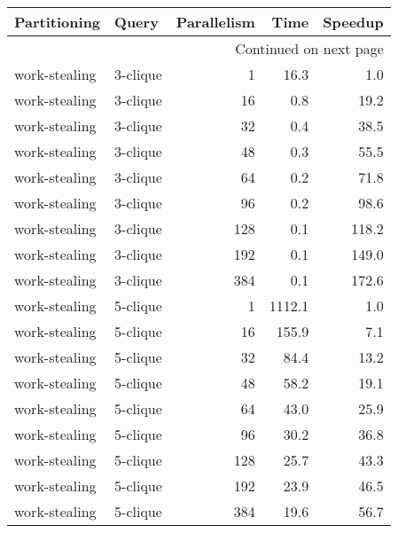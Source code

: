 \begin{longtable}{llr|rr}
\toprule
  Partitioning &     Query &  Parallelism &    Time &  Speedup \\
\midrule
\endhead
\midrule
\multicolumn{5}{r}{{Continued on next page}} \\
\midrule
\endfoot

\bottomrule
\endlastfoot
 work-stealing &  3-clique &            1 &    16.3 &      1.0 \\
 work-stealing &  3-clique &           16 &     0.8 &     19.2 \\
 work-stealing &  3-clique &           32 &     0.4 &     38.5 \\
 work-stealing &  3-clique &           48 &     0.3 &     55.5 \\
 work-stealing &  3-clique &           64 &     0.2 &     71.8 \\
 work-stealing &  3-clique &           96 &     0.2 &     98.6 \\
 work-stealing &  3-clique &          128 &     0.1 &    118.2 \\
 work-stealing &  3-clique &          192 &     0.1 &    149.0 \\
 work-stealing &  3-clique &          384 &     0.1 &    172.6 \\
 work-stealing &  5-clique &            1 &  1112.1 &      1.0 \\
 work-stealing &  5-clique &           16 &   155.9 &      7.1 \\
 work-stealing &  5-clique &           32 &    84.4 &     13.2 \\
 work-stealing &  5-clique &           48 &    58.2 &     19.1 \\
 work-stealing &  5-clique &           64 &    43.0 &     25.9 \\
 work-stealing &  5-clique &           96 &    30.2 &     36.8 \\
 work-stealing &  5-clique &          128 &    25.7 &     43.3 \\
 work-stealing &  5-clique &          192 &    23.9 &     46.5 \\
 work-stealing &  5-clique &          384 &    19.6 &     56.7 \\
\end{longtable}

